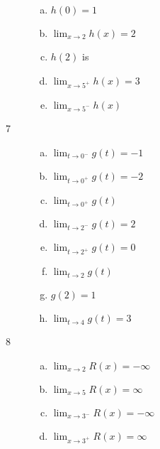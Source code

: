 \documentclass[letterpaper, landscape]{exam}
\begin{document}
\begin{description}
\begin{enumerate}[(a)]
          \item $h(0) = \boxed{ 1 }$

          \item $\lim_{x \to 2} h(x) = \boxed{ 2 }$ 

          \item $h(2)$ is 

          \item $\lim_{x \to 5^+} h(x) = \boxed{ 3 }$

          \item $\lim_{x \to 5^-} h(x)$ 

        \end{enumerate}

      \item[7]
        \begin{enumerate}[(a)]
          \item $\lim_{t \to 0^-} g(t) = \boxed{ -1 }$

          \item $\lim_{t \to 0^+} g(t) = \boxed{ -2 }$

          \item $\lim_{t \to 0^+} g(t)$ 

          \item $\lim_{t \to 2^-} g(t) = \boxed{ 2 }$

          \item $\lim_{t \to 2^+} g(t) = \boxed{ 0 }$

          \item $\lim_{t \to 2} g(t)$ 

          \item $g(2) = \boxed{ 1 }$

          \item $\lim_{t \to 4} g(t) = \boxed{ 3 }$
        \end{enumerate}

      \item[8]
        \begin{enumerate}[(a)]
          \item $\lim_{x \to 2} R(x) = \boxed{ -\infty }$

          \item $\lim_{x \to 5} R(x) = \boxed{ \infty }$

          \item $\lim_{x \to 3^-} R(x) = \boxed{ -\infty }$

          \item $\lim_{x \to 3^+} R(x) = \boxed{ \infty }$


\end{enumerate}
\end{description}
\end{document}
